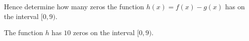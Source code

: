 Hence determine how many zeros the function $h(x)=f(x)-g(x)$
has on the interval $[0,9)$.\label{line:interval1}
\begin{shortsolution}
	The function $h$ has $10$ zeros on the
	interval $[0,9)$.\label{line:interval2}
\end{shortsolution}
